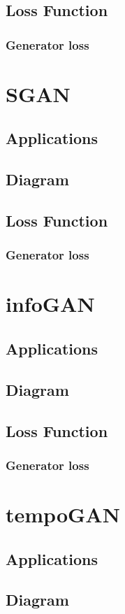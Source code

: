 \documentclass{article}
\begin{document}
\subsection{Loss Function}
\subsubsection{Generator loss}
\section{SGAN}
\subsection{Applications}
\subsection{Diagram}
\subsection{Loss Function}
\subsubsection{Generator loss}
\section{infoGAN}
\subsection{Applications}
\subsection{Diagram}
\subsection{Loss Function}
\subsubsection{Generator loss}
\section{tempoGAN}
\subsection{Applications}
\subsection{Diagram}
\end{document}
